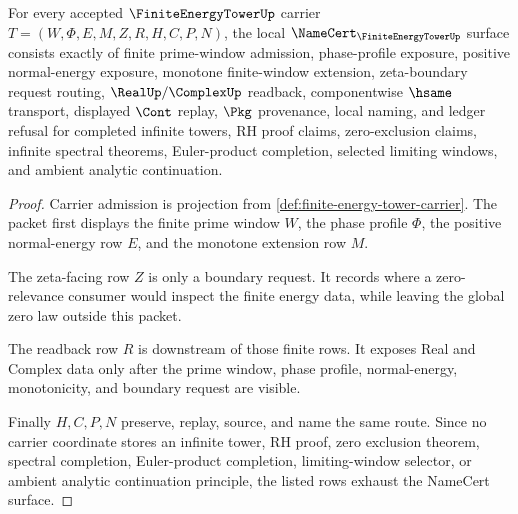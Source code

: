 \begin{theorem}
\label{thm:finite-energy-tower-namecert-obligations}
For every accepted $\FiniteEnergyTowerUp$ carrier $T=(W,\Phi,E,M,Z,R,H,C,P,N)$, the local $\NameCert_{\FiniteEnergyTowerUp}$ surface consists exactly of finite prime-window admission, phase-profile exposure, positive normal-energy exposure, monotone finite-window extension, zeta-boundary request routing, $\RealUp/\ComplexUp$ readback, componentwise $\hsame$ transport, displayed $\Cont$ replay, $\Pkg$ provenance, local naming, and ledger refusal for completed infinite towers, RH proof claims, zero-exclusion claims, infinite spectral theorems, Euler-product completion, selected limiting windows, and ambient analytic continuation.
\end{theorem}
\begin{proof}
Carrier admission is projection from \autoref{def:finite-energy-tower-carrier}. The packet first displays the finite prime window $W$, the phase profile $\Phi$, the positive normal-energy row $E$, and the monotone extension row $M$.

The zeta-facing row $Z$ is only a boundary request. It records where a zero-relevance consumer would inspect the finite energy data, while leaving the global zero law outside this packet.

The readback row $R$ is downstream of those finite rows. It exposes Real and Complex data only after the prime window, phase profile, normal-energy, monotonicity, and boundary request are visible.

Finally $H,C,P,N$ preserve, replay, source, and name the same route. Since no carrier coordinate stores an infinite tower, RH proof, zero exclusion theorem, spectral completion, Euler-product completion, limiting-window selector, or ambient analytic continuation principle, the listed rows exhaust the NameCert surface.
\end{proof}



